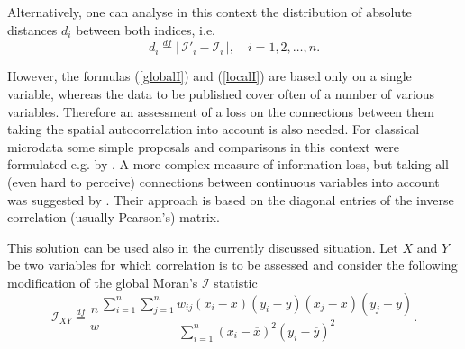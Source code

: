 Alternatively, one can analyse in this context the distribution of absolute distances $d_i$ between both indices, i.e.
\begin{equation}
d_i\stackrel{df}{=}\left|\,\mathcal{I}'_i- \mathcal{I}_i\,\right|,\quad i=1,2,\ldots,n.
\label{eq:d_i}
\end{equation}

However, the formulas (\ref{globalI}) and (\ref{localI}) are based only on a single variable, whereas the data to be published cover often of a number of various variables. Therefore an assessment of a loss on the connections between them taking the spatial autocorrelation into account is also needed. For classical microdata some simple proposals and comparisons in this context were formulated e.g. by \cite{Domingo2001}. A more complex measure of information loss, but taking all (even hard to perceive) connections between continuous variables into account was suggested by \cite{Mlodak2022}. Their approach is based on the diagonal entries of the inverse correlation (usually Pearson's) matrix.

This solution can be used also in the currently discussed situation. Let $X$ and $Y$ be two variables for which correlation is to be assessed and consider the following modification of the global  Moran's $\mathcal{I}$ statistic
\begin{equation}
 \mathcal{I}_{XY}\stackrel{df}{=}\frac{n}{w}\frac{\sum_{i=1}^n{\sum_{j=1}^n{w_{ij}(x_i-\overline{x})(y_i-\overline{y})(x_j-\overline{x})(y_j-\overline{y})}}}{\sum_{i=1}^n{(x_i-\overline{x})^2(y_i-\overline{y})^2}}.
\label{globalIXY}
\end{equation}


